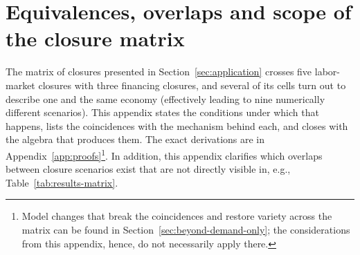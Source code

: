 
\section{Equivalences, overlaps and scope of the closure matrix}\label{app:equivalences}

\noindent
The matrix of closures presented in Section~\ref{sec:application} crosses five
labor-market closures with three financing closures, and several of its
cells turn out to describe one and the same economy (effectively leading to nine numerically different scenarios). This appendix states the
conditions under which that happens, lists the coincidences with the
mechanism behind each, and closes with the algebra that produces them. The
exact derivations are in Appendix~\ref{app:proofs}\footnote{Model changes that
break the coincidences and restore variety across the matrix can be found in
Section~\ref{sec:beyond-demand-only}; the considerations from this appendix,
hence, do not necessarily apply there.}. In addition, this appendix clarifies
which overlaps between closure scenarios exist that are not directly visible
in, e.g., Table~\ref{tab:results-matrix}.

